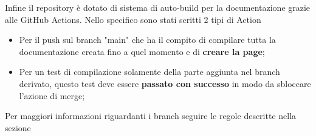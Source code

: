         Infine il repository è dotato di sistema di auto-build per la documentazione grazie alle GitHub Actions. Nello specifico sono stati scritti 2 tipi di Action
        \begin{itemize}
            \item Per il push sul branch "main" che ha il compito di compilare tutta la documentazione creata fino a quel momento e di \textbf{creare la page};
            \item Per un test di compilazione solamente della parte aggiunta nel branch derivato, questo test deve essere \textbf{passato con successo} in modo da sbloccare l'azione di merge;
        \end{itemize}
        Per maggiori informazioni riguardanti i branch seguire le regole descritte nella sezione 

